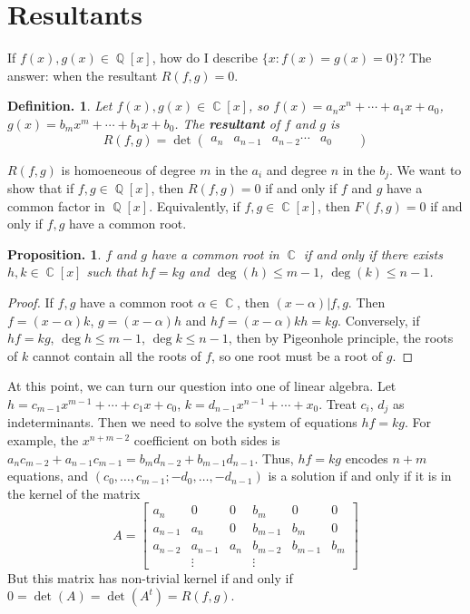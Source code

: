 \documentclass[11pt, a4paper]{memoir}
\DeclareMathOperator{\Q}{{\mathbb{Q}}}
\DeclareMathOperator{\C}{{\mathbb{C}}}
\theoremstyle{change}
\newtheorem{proposition}[theorem]{Proposition.}
\theoremstyle{plain}
\theoremstyle{nonumberplain}
\newtheorem{definition}{Definition.}
\newtheorem{proof}{Proof}
\begin{document}
\section{Resultants}
If $f(x),g(x)\in\Q[x]$, how do I describe $\{x:f(x)=g(x)=0\}$?
The answer: when the resultant $R(f,g)=0$.
\begin{definition}
    Let $f(x),g(x)\in\C[x]$, so $f(x)=a_nx^n+\cdots+a_1x+a_0$, $g(x)=b_mx^m+\cdots+b_1x+b_0$.
    The \textbf{resultant} of $f$ and $g$ is
    \begin{equation*}
        R(f,g) =\det
        \begin{pmatrix}
            a_n&a_{n-1}&a_{n-2}\cdots&a_0&&
        \end{pmatrix}
    \end{equation*}
\end{definition}
$R(f,g)$ is homoeneous of degree $m$ in the $a_i$ and degree $n$ in the $b_j$.
We want to show that if $f,g\in\Q[x]$, then $R(f,g)=0$ if and only if $f$ and $g$ have a common factor in $\Q[x]$.
Equivalently, if $f,g\in\C[x]$, then $F(f,g)=0$ if and only if $f,g$ have a common root.
\begin{proposition}
    $f$ and $g$ have a common root in $\C$ if and only if there exists $h,k\in\C[x]$ such that $hf=kg$ and $\deg(h)\leq m-1$, $\deg(k)\leq n-1$.
\end{proposition}
\begin{proof}
    If $f,g$ have a common root $\alpha\in\C$, then $(x-\alpha)|f,g$.
    Then $f=(x-\alpha)k$, $g=(x-\alpha)h$ and $hf=(x-\alpha)kh=kg$.
    Conversely, if $hf=kg$, $\deg h\leq m-1$, $\deg k\leq n-1$, then by Pigeonhole principle, the roots of $k$ cannot contain all the roots of $f$, so one root must be a root of $g$.
\end{proof}
At this point, we can turn our question into one of linear algebra.
Let $h=c_{m-1}x^{m-1}+\cdots+c_1x+c_0$, $k=d_{n-1}x^{n-1}+\cdots+x_0$.
Treat $c_i$, $d_j$ as indeterminants.
Then we need to solve the system of equations $hf=kg$.
For example, the $x^{n+m-2}$ coefficient on both sides is $a_nc_{m-2}+a_{n-1}c_{m-1}=b_md_{n-2}+b_{m-1}d_{n-1}$.
Thus, $hf=kg$ encodes $n+m$ equations, and $(c_0,\ldots,c_{m-1};-d_0,\ldots,-d_{n-1})$ is a solution if and only if it is in the kernel of the matrix
\begin{equation*}
    A=
    \begin{bmatrix}
        a_n&0&0&b_m&0&0\\
        a_{n-1}&a_n&0&b_{m-1}&b_m&0\\
        a_{n-2}&a_{n-1}&a_n&b_{m-2}&b_{m-1}&b_m\\
               &\vdots&&\vdots&
    \end{bmatrix}
\end{equation*}
But this matrix has non-trivial kernel if and only if $0=\det(A)=\det(A^t)=R(f,g)$.
\end{document}
